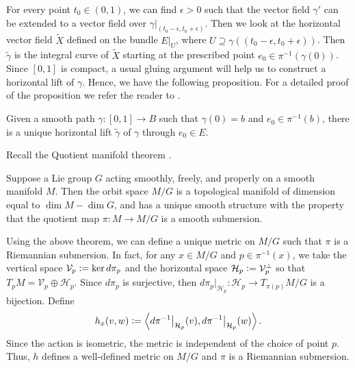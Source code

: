 \vspace{0.3cm}
\hf For every point $t_0\in (0,1)$, we can find $\epsilon>0$ such that the vector field $\gamma'$ can be extended to a vector field over $\gamma\big|_{(t_0-\epsilon,t_0+\epsilon)}$. Then we look at the horizontal vector field $\tilde{X}$ defined on the bundle $E\big|_{U}$, where $U\supseteq \gamma((t_0-\epsilon,t_0+\epsilon))$. Then $\tilde{\gamma}$ is the integral curve of $\tilde{X}$ starting at the prescribed point $e_0\in \pi^{-1}(\gamma(0))$. Since $[0, 1]$ is compact, a usual gluing argument will help us to construct a horizontal lift of $\gamma$. Hence, we have the following proposition. For a detailed proof of the proposition we refer the reader to \cite[Chapter XIV, Proposition 3.5(i)]{Lang99}.
\begin{prop}\label{prop:uniqueness-of-horizontal-lift}
	Given a smooth path $\gamma:[0,1]\to B$ such that $\gamma(0)=b$ and $e_0\in \pi^{-1}(b)$, there is a unique horizontal lift $\tilde{\gamma}$ of $\gamma$ through $e_0\in E$.
\end{prop}

\vspace{0.3cm}
\noindent Recall the Quotient manifold theorem \cite[Theorem 21.10]{Lee13}.

\begin{thm}
	Suppose a Lie group $G$  acting smoothly, freely, and properly on a smooth manifold $M$. Then the orbit space $M/G$ is a topological manifold of dimension equal to $\dim M-\dim G$, and has a unique smooth structure with the property that the quotient map $\pi:M\to M/G$  is a smooth submersion.
\end{thm}

\vspace{0.3cm}
\noindent Using the above theorem, we can define a unique metric on $M/G$ such that $\pi$ is a Riemannian submersion. In fact, for any $x\in M/G$ and $p\in \pi^{-1}(x)$, we take the vertical space $\mathcal{V}_p \vcentcolon= \ker d\pi_p$ and the horizontal space $\mathcal{H}_p\vcentcolon= \mathcal{V}_p^\perp$ so that $T_pM = \mathcal{V}_p \oplus \mathcal{H}_p$. Since $d\pi_p$ is surjective, then $d\pi_p\big|_{\mathcal{H}_p}:\mathcal{H}_p\to T_{\pi(p)}M/G$ is a bijection. Define 
\begin{displaymath}
	h_x( v,w) \vcentcolon= \left\langle d\pi^{-1}\big|_{\mathcal{H}_p}(v),d\pi^{-1}\big|_{\mathcal{H}_p}(w) \right\rangle.
\end{displaymath}
Since the action is isometric, the metric is independent of the choice of point $p$. Thus, $h$ defines a well-defined metric on $M/G$ and $\pi$ is a Riemannian submersion.

